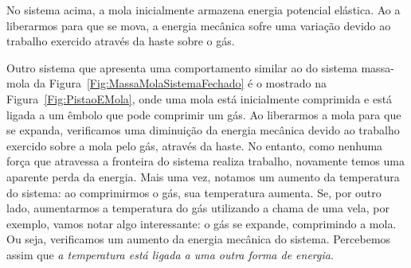 \begin{marginfigure}
\centering
{}
\caption{No sistema acima, a mola inicialmente armazena energia potencial elástica. Ao a liberarmos para que se mova, a energia mecânica sofre uma variação devido ao trabalho exercido através da haste sobre o gás.\label{Fig:PistaoEMola}}
\end{marginfigure}

Outro sistema que apresenta uma comportamento similar ao do sistema massa-mola da Figura~\ref{Fig:MassaMolaSistemaFechado} é o mostrado na Figura~\ref{Fig:PistaoEMola}, onde uma mola está inicialmente comprimida e está ligada a um êmbolo que pode comprimir um gás. Ao liberarmos a mola para que se expanda, verificamos uma diminuição da energia mecânica devido ao trabalho exercido sobre a mola pelo gás, através da haste. No entanto, como nenhuma força que atravessa a fronteira do sistema realiza trabalho, novamente temos uma aparente perda da energia. Mais uma vez, notamos um aumento da temperatura do sistema: ao comprimirmos o gás, sua temperatura aumenta. Se, por outro lado, aumentarmos a temperatura do gás utilizando a chama de uma vela, por exemplo, vamos notar algo interessante: o gás se expande, comprimindo a mola. Ou seja, verificamos um aumento da energia mecânica do sistema. Percebemos assim que \emph{a temperatura está ligada a uma outra forma de energia}.

